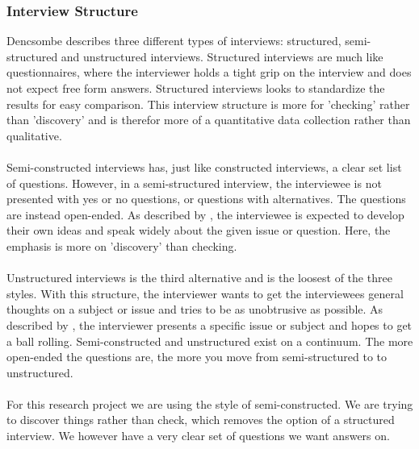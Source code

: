 \documentclass{cslthse-msc}
\begin{document}
    \subsubsection{Interview Structure}
    Dencsombe describes three different types of interviews: structured, semi-structured and
    unstructured interviews. Structured interviews are much like questionnaires, where
    the interviewer holds a tight grip on the interview and does not expect free form answers.
    Structured interviews looks to standardize the results for easy comparison.
    This interview structure is more for 'checking' rather than 'discovery' and is
    therefor more of a quantitative data collection rather than qualitative.
    \\ \\
    Semi-constructed interviews has, just like constructed interviews, a clear set
    list of questions. However, in a semi-structured interview, the interviewee
    is not presented with yes or no questions, or questions with alternatives.
    The questions are instead open-ended. As described by \citet{denscombe}, the interviewee
    is expected to develop their own ideas and speak widely about the given issue or question.
    Here, the emphasis is more on 'discovery' than checking.
    \\ \\
    Unstructured interviews is the third alternative and is the loosest of the three styles.
    With this structure, the interviewer wants to get the interviewees general thoughts
    on a subject or issue and tries to be as unobtrusive as possible. As described by \citet{denscombe},
    the interviewer presents a specific issue or subject and hopes to get a ball rolling.
    Semi-constructed and unstructured exist on a continuum. The more open-ended the questions
    are, the more you move from semi-structured to to unstructured.
    \\ \\
    For this research project we are using the style of semi-constructed.
    We are trying to discover things rather than check, which removes the option
    of a structured interview. We however have a very clear set of questions
    we want answers on.
\end{document}
